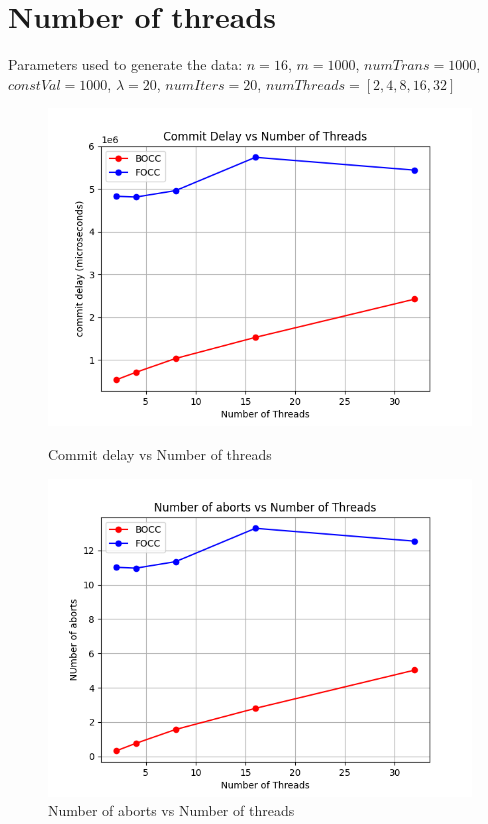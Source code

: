 \documentclass[12pt]{article}
\begin{document}
\section*{Number of threads}
Parameters used to generate the data:
$n=16$, $m=1000$, $numTrans=1000$, $constVal=1000$, $\lambda=20$, $numIters = 20$, $numThreads = [2, 4, 8, 16, 32]$
\begin{figure}[h]
    \centering
    \begin{minipage}[b]{0.45\textwidth}
        \includegraphics[width=\textwidth]{../code/commitDelayVsNumThreads.png}
        \caption{Commit delay vs Number of threads}
    \end{minipage}
    \hfill
    \begin{minipage}[b]{0.45\textwidth}
        \includegraphics[width=\textwidth]{../code/numAbortsVsNumThreads.png}
        \caption{Number of aborts vs Number of threads}
    \end{minipage}
\end{figure}
\end{document}
